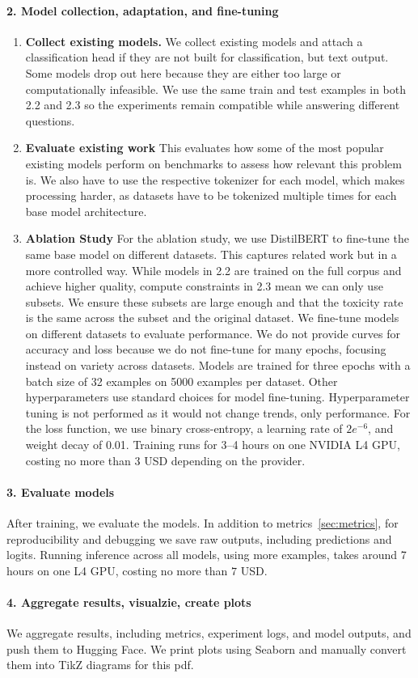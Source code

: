 \paragraph{2. Model collection, adaptation, and fine-tuning}

\begin{enumerate}
    \item \textbf{Collect existing models.} We collect existing models and attach a classification head if they are not built for classification, but text output. Some models drop out here because they are either too large or computationally infeasible. We use the same train and test examples in both 2.2 and 2.3 so the experiments remain compatible while answering different questions.

    \item \textbf{Evaluate existing work} This evaluates how some of the most popular existing models perform on benchmarks to assess how relevant this problem is. We also have to use the respective tokenizer for each model, which makes processing harder, as datasets have to be tokenized multiple times for each base model architecture. 

    \item \textbf{Ablation Study} For the ablation study, we use DistilBERT to fine-tune the same base model on different datasets. This captures related work but in a more controlled way. While models in 2.2 are trained on the full corpus and achieve higher quality, compute constraints in 2.3 mean we can only use subsets. We ensure these subsets are large enough and that the toxicity rate is the same across the subset and the original dataset. We fine-tune models on different datasets to evaluate performance. We do not provide curves for accuracy and loss because we do not fine-tune for many epochs, focusing instead on variety across datasets. Models are trained for three epochs with a batch size of 32 examples on 5000 examples per dataset. Other hyperparameters use standard choices for model fine-tuning. Hyperparameter tuning is not performed as it would not change trends, only performance. For the loss function, we use binary cross-entropy, a learning rate of $2e^{-6}$, and weight decay of 0.01. Training runs for 3–4 hours on one NVIDIA L4 GPU, costing no more than $3$ USD depending on the provider.
\end{enumerate}

\paragraph{3. Evaluate models}
After training, we evaluate the models. In addition to metrics~\ref{sec:metrics}, for reproducibility and debugging we save raw outputs, including predictions and logits. Running inference across all models, using more examples, takes around 7 hours on one L4 GPU, costing no more than $7$ USD.

\paragraph{4. Aggregate results, visualzie, create plots}
We aggregate results, including metrics, experiment logs, and model outputs, and push them to Hugging Face. We print plots using Seaborn and manually convert them into TikZ diagrams for this pdf.